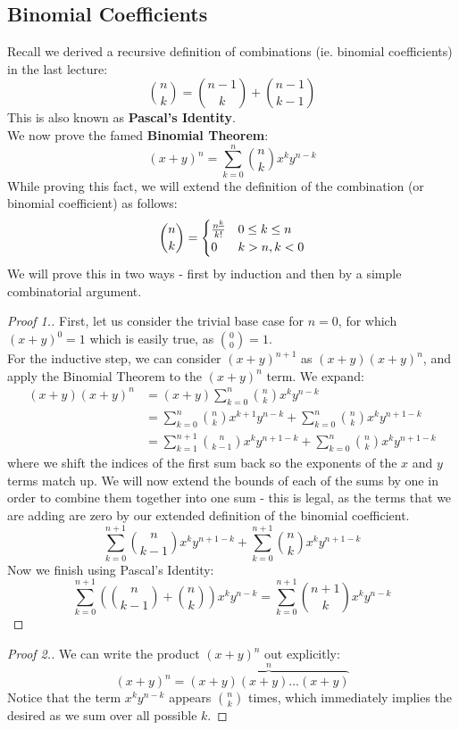 \subsection{Binomial Coefficients}
Recall we derived a recursive definition of combinations (ie. binomial coefficients) in the last lecture: 
\[
	\binom{n}{k} = \binom{n-1}{k} + \binom{n-1}{k-1}
\]
This is also known as \textbf{Pascal's Identity}.\\
We now prove the famed \textbf{Binomial Theorem}: 
\[
	(x+y)^n = \sum_{k=0}^n \binom{n}{k} x^k y^{n-k}
\]
While proving this fact, we will extend the definition of the combination (or binomial coefficient) as follows:
\[
	\binom{n}{k} = \begin{cases} 
      \frac{{n}^{\underline{k}}}{k!} & 0 \leq k \leq n \\
      0 & k > n, k < 0
   \end{cases}
\]
We will prove this in two ways - first by induction and then by a simple combinatorial argument. 
\begin{proof}[Proof 1.]
	First, let us consider the trivial base case for $n=0$, for which $(x+y)^0 = 1$ which is easily true, as $\binom{0}{0} = 1$.  \\
	For the inductive step, we can consider $(x+y)^{n+1}$ as $(x+y)(x+y)^n$, and apply the Binomial Theorem to the $(x+y)^n$ term. We expand: 
\begin{align*}
(x+y)(x+y)^n &= (x+y) \sum_{k=0}^n \binom{n}{k} x^k y^{n-k} \\
&= \sum_{k=0}^n \binom{n}{k} x^{k+1} y^{n-k} + \sum_{k=0}^n \binom{n}{k} x^k y^{n+1-k} \\
&= \sum_{k=1}^{n+1} \binom{n}{k-1} x^{k} y^{n+1-k} + \sum_{k=0}^n \binom{n}{k} x^k y^{n+1-k} 
\end{align*}
where we shift the indices of the first sum back so the exponents of the $x$ and $y$ terms match up. We will now extend the bounds of each of the sums by one in order to combine them together into one sum - this is legal, as the terms that we are adding are zero by our extended definition of the binomial coefficient. 
\[
	\sum_{k=0}^{n+1} \binom{n}{k-1} x^{k} y^{n+1-k} + \sum_{k=0}^{n+1} \binom{n}{k} x^k y^{n+1-k} 
\]
Now we finish using Pascal's Identity:
\[
	\sum_{k=0}^{n+1} \left(\binom{n}{k-1} + \binom{n}{k}\right) x^{k} y^{n-k} = \sum_{k=0}^{n+1} \binom{n+1}{k} x^{k} y^{n-k} 
\]
\end{proof}
\begin{proof}[Proof 2.]
	We can write the product $(x+y)^n$ out explicitly:
\[
	(x+y)^n = \overbrace{(x+y)(x+y)\ldots (x+y)}^n
\]
Notice that the term $x^k y^{n-k}$ appears $\binom{n}{k}$ times, which immediately implies the desired as we sum over all possible $k$. 
\end{proof}
